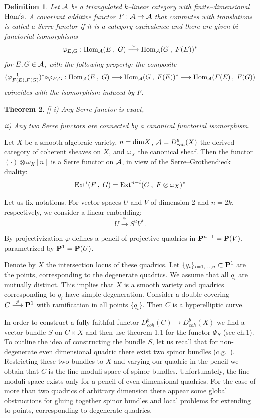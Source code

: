 \documentclass[12pt]{article}
\newtheorem{theorem}{Theorem}[section]
\newtheorem{definition}[theorem]{Definition}
\def\db#1{ D^b_{coh}({#1})}
\def\lto{\longrightarrow}
\begin{document}
\begin{definition}\label{SF}
Let ${\cal A}$ be a triangulated $k$--linear category with finite--dimensional ${\rm Hom's}$. A covariant additive functor $F: {\cal A}\to{\cal A}$ that commutes with translations is called a {\sf Serre functor} if it is a category equivalence and there are given bi--functorial isomorphisms
$$
\varphi_{E,G}: {\rm Hom}_{\cal A}(E\:, \;G)\stackrel{\sim}{\lto}{\rm Hom}_{\cal A}(G\:, \;F(E))^*
$$
for $E,G\in{\cal A}$, with the following property: the composite
$$
(\varphi_{F(E),F(G)}^{-1})^*{\scriptsize{\circ}}\varphi_{E,G}: {\rm Hom}_{\cal A}(E\:, \;G)\lto{\rm Hom}_{\cal A}(G\:, \;F(E))^*\lto{\rm Hom}_{\cal A}(F(E)\:, \;F(G))
$$
coincides with the isomorphism induced by $F$.
\end{definition}

\begin{theorem}\label{USF}[\cite{BK}]
i) Any Serre functor is exact,

ii) Any two Serre functors are connected by a canonical
functorial isomorphism.
\end{theorem}
Let $X$ be a smooth algebraic variety, $n={\rm dim}X$, ${\cal A}=\db{X}$ the derived category of coherent sheaves on $X$, and $\omega_X$ the canonical sheaf. Then the functor $(\cdot)\otimes\omega_X[n]$ is a Serre functor on ${\cal A}$, in view of the Serre--Grothendieck duality:
$$
{\rm Ext}^i(F\:,\;G)={\rm Ext}^{n-i}(G\:,\;F\otimes\omega_X)^* 
$$





Let us fix notations. For vector spaces $U$ and $V$ of dimension 2 and $n=2k$, respectively, we consider a linear embedding:
$$U\stackrel{\varphi}{\longrightarrow} S^2V^*.$$

By projectivization $\varphi$ defines a pencil of projective quadrics in ${\bf P}^{n-1}={\bf P}(V)$, parametrized by ${\bf P}^1={\bf P}(U)$.

Denote by $X$ the intersection locus of these quadrics. Let 
$\{q_i\}_{i=1,\ldots,n}\subset {\bf P}^1$ are the points, corresponding to the degenerate quadrics. We assume that all $q_i$ are mutually distinct. This implies that $X$ is a smooth variety and quadrics corresponding to $q_i$ have simple degeneration. Consider a double covering 
$C\stackrel{p}{\longrightarrow} {\bf P}^1$
with ramification in all points $\{q_i\}$. Then $C$ is a hyperelliptic curve.

In order to construct a fully faithful functor
$D_{coh}^b(C)\longrightarrow D_{coh}^b(X)$ we find a vector bundle $S$ on $C\times X$ and then use theorem 1.1 for the functor $\Phi_S$ (see ch.1). To outline the idea of constructing the bundle $S$, let us recall that for non-degenerate even dimensional quadric there exist two spinor bundles (c.g.~\cite{KAPR}). Restricting these two bundles  to $X$  and varying our quadric in the pencil we obtain that $C$ is the fine moduli space of spinor bundles. 
Unfortunately, the fine moduli space exists only for a pencil of even dimensional quadrics. For the case of more than two quadrics of arbitrary dimension there appear some global obstructions for gluing together spinor bundles and local problems for extending to points, corresponding to degenerate quadrics.
\end{document}
